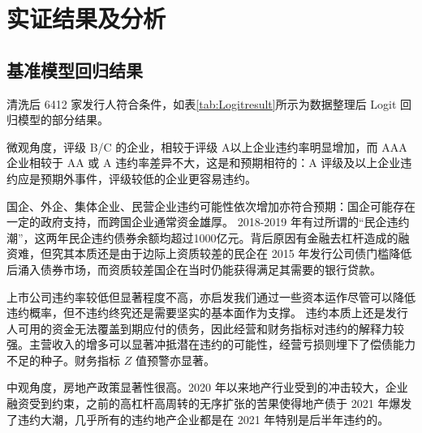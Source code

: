 \chapter{实证结果及分析}

\section{基准模型回归结果}
清洗后 6412 家发行人符合条件，如表\ref{tab:Logitresult}所示为数据整理后 Logit 回归模型的部分结果。


微观角度，评级 B/C 的企业，相较于评级 A以上企业违约率明显增加，而 AAA 企业相较于 AA 或 A 违约率差异不大，这是和预期相符的：A 评级及以上企业违约应是预期外事件，评级较低的企业更容易违约。

国企、外企、集体企业、民营企业违约可能性依次增加亦符合预期：国企可能存在一定的政府支持\autocite{mo2021china}，而跨国企业通常资金雄厚。
2018-2019 年有过所谓的“民企违约潮”，这两年民企违约债券余额均超过1000亿元。背后原因有金融去杠杆造成的融资难，但究其本质还是由于边际上资质较差的民企在 2015 年发行公司债门槛降低后涌入债券市场，而资质较差国企在当时仍能获得满足其需要的银行贷款。

上市公司违约率较低但显著程度不高，亦启发我们通过一些资本运作尽管可以降低违约概率，但不违约终究还是需要坚实的基本面作为支撑。
违约本质上还是发行人可用的资金无法覆盖到期应付的债务，因此经营和财务指标对违约的解释力较强。主营收入的增多可以显著冲抵潜在违约的可能性，经营亏损则埋下了偿债能力不足的种子。财务指标 \(Z\) 值预警亦显著。

中观角度，房地产政策显著性很高。2020 年以来地产行业受到的冲击较大，企业融资受到约束，之前的高杠杆高周转的无序扩张的苦果使得地产债于 2021 年爆发了违约大潮，几乎所有的违约地产企业都是在 2021 年特别是后半年违约的。

